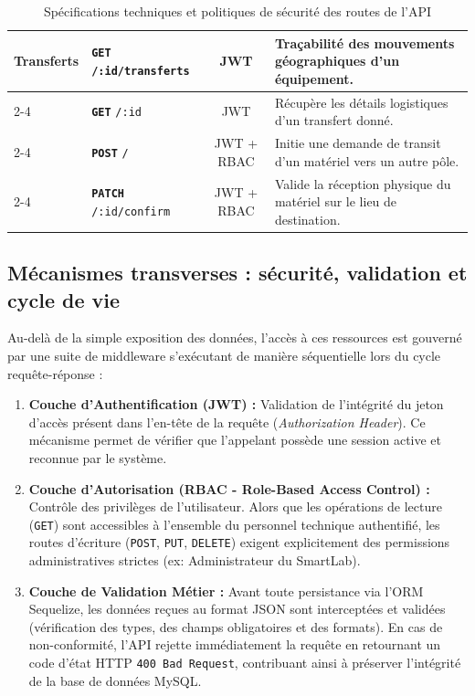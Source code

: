 \begin{table}[H]
\begin{tabularx}{\textwidth}{|l|l|c|X|}
\multirow{4}{*}{\textbf{Transferts}} 
 & \textbf{\texttt{GET}} \texttt{/:id/transferts} & JWT & Traçabilité des mouvements géographiques d'un équipement. \\ \cline{2-4} 
 & \textbf{\texttt{GET}} \texttt{/:id} & JWT & Récupère les détails logistiques d'un transfert donné. \\ \cline{2-4} 
 & \textbf{\texttt{POST}} \texttt{/} & JWT + RBAC & Initie une demande de transit d'un matériel vers un autre pôle. \\ \cline{2-4} 
 & \textbf{\texttt{PATCH}} \texttt{/:id/confirm} & JWT + RBAC & Valide la réception physique du matériel sur le lieu de destination. \\ \hline
\end{tabularx}
\caption{Spécifications techniques et politiques de sécurité des routes de l'API}
\label{tab:routes_api_equipements}
\end{table}

\subsection{Mécanismes transverses : sécurité, validation et cycle de vie}
\label{subsec:endpoints_transverses}

Au-delà de la simple exposition des données, l'accès à ces ressources est gouverné par une suite de middleware s'exécutant de manière séquentielle lors du cycle requête-réponse :

\begin{enumerate}
    \item \textbf{Couche d'Authentification (JWT) :} Validation de l'intégrité du jeton d'accès présent dans l'en-tête de la requête (\textit{Authorization Header}). Ce mécanisme permet de vérifier que l'appelant possède une session active et reconnue par le système.
    \item \textbf{Couche d'Autorisation (RBAC - Role-Based Access Control) :} Contrôle des privilèges de l'utilisateur. Alors que les opérations de lecture (\texttt{GET}) sont accessibles à l'ensemble du personnel technique authentifié, les routes d'écriture (\texttt{POST}, \texttt{PUT}, \texttt{DELETE}) exigent explicitement des permissions administratives strictes (ex: Administrateur du SmartLab).
    \item \textbf{Couche de Validation Métier :} Avant toute persistance via l'ORM Sequelize, les données reçues au format JSON sont interceptées et validées (vérification des types, des champs obligatoires et des formats). En cas de non-conformité, l'API rejette immédiatement la requête en retournant un code d'état HTTP \texttt{400 Bad Request}, contribuant ainsi à préserver l'intégrité de la base de données MySQL.
\end{enumerate}

